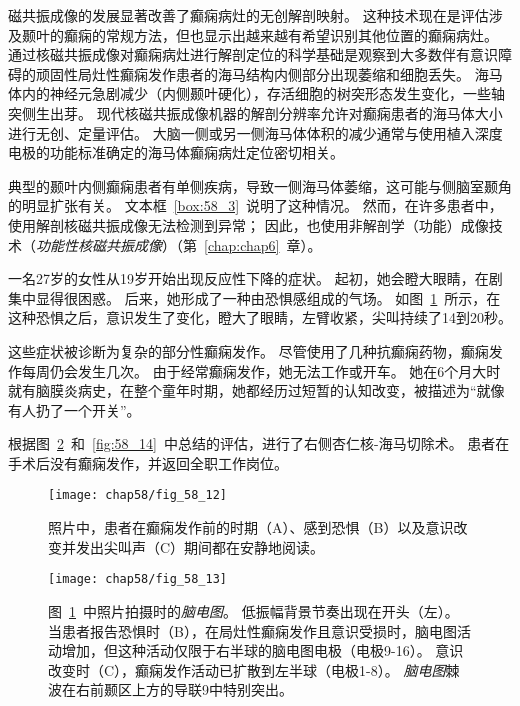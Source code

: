 磁共振成像的发展显著改善了癫痫病灶的无创解剖映射。
这种技术现在是评估涉及颞叶的癫痫的常规方法，但也显示出越来越有希望识别其他位置的癫痫病灶。
通过核磁共振成像对癫痫病灶进行解剖定位的科学基础是观察到大多数伴有意识障碍的顽固性局灶性癫痫发作患者的海马结构内侧部分出现萎缩和细胞丢失。
海马体内的神经元急剧减少（内侧颞叶硬化），存活细胞的树突形态发生变化，一些轴突侧生出芽。
现代核磁共振成像机器的解剖分辨率允许对癫痫患者的海马体大小进行无创、定量评估。
大脑一侧或另一侧海马体体积的减少通常与使用植入深度电极的功能标准确定的海马体癫痫病灶定位密切相关。


典型的颞叶内侧癫痫患者有单侧疾病，导致一侧海马体萎缩，这可能与侧脑室颞角的明显扩张有关。
文本框~\ref{box:58_3}~说明了这种情况。
然而，在许多患者中，使用解剖核磁共振成像无法检测到异常；
因此，也使用非解剖学（功能）成像技术（\textit{功能性核磁共振成像}）（第~\ref{chap:chap6}~章）。


\begin{proposition}[神经解剖学导航术语] \label{box:58_3}
	
	\quad \quad 一名27岁的女性从19岁开始出现反应性下降的症状。
	起初，她会瞪大眼睛，在剧集中显得很困惑。
	后来，她形成了一种由恐惧感组成的气场。
	如图~\ref{fig:58_12}~所示，在这种恐惧之后，意识发生了变化，瞪大了眼睛，左臂收紧，尖叫持续了14到20秒。
	
	\quad \quad 这些症状被诊断为复杂的部分性癫痫发作。
	尽管使用了几种抗癫痫药物，癫痫发作每周仍会发生几次。
	由于经常癫痫发作，她无法工作或开车。
	她在6个月大时就有脑膜炎病史，在整个童年时期，她都经历过短暂的认知改变，被描述为“就像有人扔了一个开关”。
	
	\quad \quad 根据图~\ref{fig:58_13}~和~\ref{fig:58_14}~中总结的评估，进行了右侧杏仁核-海马切除术。
	患者在手术后没有癫痫发作，并返回全职工作岗位。
	
\end{proposition}


\begin{figure}[htbp]
	\centering
	\texttt{[image: chap58/fig\_58\_12]}
	\caption{照片中，患者在癫痫发作前的时期（A）、感到恐惧（B）以及意识改变并发出尖叫声（C）期间都在安静地阅读。}
	\label{fig:58_12}
\end{figure}


\begin{figure}[htbp]
	\centering
	\texttt{[image: chap58/fig\_58\_13]}
	\caption{图~\ref{fig:58_12}~中照片拍摄时的\textit{脑电图}。
		低振幅背景节奏出现在开头（左）。
		当患者报告恐惧时（B），在局灶性癫痫发作且意识受损时，脑电图活动增加，但这种活动仅限于右半球的脑电图电极（电极9-16）。
		意识改变时（C），癫痫发作活动已扩散到左半球（电极1-8）。
		\textit{脑电图}棘波在右前颞区上方的导联9中特别突出。}
	\label{fig:58_13}
\end{figure}



